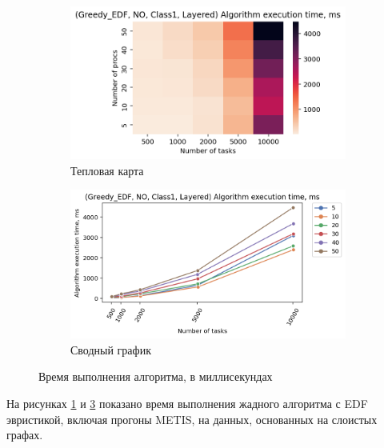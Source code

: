 \begin{figure}[!htbp]
    \centering
    \begin{subfigure}{0.49\textwidth}
        \includegraphics[width=\textwidth]{imgs/layered_class_1/NO_EDF/et_heatmap.png}
        \caption{Тепловая карта}
        \label{fig:NO-layered-EDF-exec-time-heatmap}
    \end{subfigure}
    \hfill
    \begin{subfigure}{0.49\textwidth}
        \includegraphics[width=\textwidth]{imgs/layered_class_1/NO_EDF/tr_graph.png}
        \caption{Сводный график}
        \label{fig:NO-layered-EDF-exec-time-compiled}
    \end{subfigure}
    \caption{Время выполнения алгоритма, в миллисекундах}
\end{figure}

На рисунках \ref{fig:NO-layered-EDF-exec-time-heatmap} и \ref{fig:NO-layered-EDF-exec-time-compiled} показано время выполнения жадного алгоритма с EDF эвристикой, включая прогоны METIS, на данных, основанных на слоистых графах.

